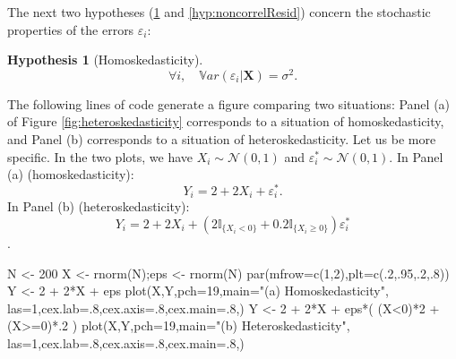 \documentclass[
  12pt,
]{book}
\newenvironment{Shaded}{\begin{snugshade}}{\end{snugshade}}
\newcommand{\AttributeTok}[1]{\textcolor[rgb]{0.77,0.63,0.00}{#1}}
\newcommand{\DecValTok}[1]{\textcolor[rgb]{0.00,0.00,0.81}{#1}}
\newcommand{\FunctionTok}[1]{\textcolor[rgb]{0.00,0.00,0.00}{#1}}
\newcommand{\NormalTok}[1]{#1}
\newcommand{\OtherTok}[1]{\textcolor[rgb]{0.56,0.35,0.01}{#1}}
\newcommand{\SpecialCharTok}[1]{\textcolor[rgb]{0.00,0.00,0.00}{#1}}
\newcommand{\StringTok}[1]{\textcolor[rgb]{0.31,0.60,0.02}{#1}}
\theoremstyle{definition}
\theoremstyle{definition}
\theoremstyle{definition}
\theoremstyle{definition}
\newtheorem{hypothesis}{Hypothesis}[chapter]
\theoremstyle{remark}
\begin{document}
The next two hypotheses (\ref{hyp:homoskedasticity} and \ref{hyp:noncorrelResid}) concern the stochastic properties of the errors \(\varepsilon_i\):

\begin{hypothesis}[Homoskedasticity]
\protect\hypertarget{hyp:homoskedasticity}{}\label{hyp:homoskedasticity}\[
\forall i, \quad \mathbb{V}ar(\varepsilon_i|\mathbf{X}) = \sigma^2.
\]
\end{hypothesis}

The following lines of code generate a figure comparing two situations: Panel (a) of Figure \ref{fig:heteroskedasticity} corresponds to a situation of homoskedasticity, and Panel (b) corresponds to a situation of heteroskedasticity. Let us be more specific. In the two plots, we have \(X_i \sim \mathcal{N}(0,1)\) and \(\varepsilon^*_i \sim \mathcal{N}(0,1)\). In Panel (a) (homoskedasticity):
\[
Y_i = 2 + 2X_i + \varepsilon^*_i.
\]
In Panel (b) (heteroskedasticity):
\[
Y_i = 2 + 2X_i + \left(2\mathbb{I}_{\{X_i<0\}}+0.2\mathbb{I}_{\{X_i\ge0\}}\right)\varepsilon^*_i\].

\begin{Shaded}
\begin{Highlighting}[]
\NormalTok{N }\OtherTok{\textless{}{-}} \DecValTok{200}
\NormalTok{X }\OtherTok{\textless{}{-}} \FunctionTok{rnorm}\NormalTok{(N);eps }\OtherTok{\textless{}{-}} \FunctionTok{rnorm}\NormalTok{(N)}
\FunctionTok{par}\NormalTok{(}\AttributeTok{mfrow=}\FunctionTok{c}\NormalTok{(}\DecValTok{1}\NormalTok{,}\DecValTok{2}\NormalTok{),}\AttributeTok{plt=}\FunctionTok{c}\NormalTok{(.}\DecValTok{2}\NormalTok{,.}\DecValTok{95}\NormalTok{,.}\DecValTok{2}\NormalTok{,.}\DecValTok{8}\NormalTok{))}
\NormalTok{Y }\OtherTok{\textless{}{-}} \DecValTok{2} \SpecialCharTok{+} \DecValTok{2}\SpecialCharTok{*}\NormalTok{X }\SpecialCharTok{+}\NormalTok{ eps}
\FunctionTok{plot}\NormalTok{(X,Y,}\AttributeTok{pch=}\DecValTok{19}\NormalTok{,}\AttributeTok{main=}\StringTok{"(a) Homoskedasticity"}\NormalTok{,}
     \AttributeTok{las=}\DecValTok{1}\NormalTok{,}\AttributeTok{cex.lab=}\NormalTok{.}\DecValTok{8}\NormalTok{,}\AttributeTok{cex.axis=}\NormalTok{.}\DecValTok{8}\NormalTok{,}\AttributeTok{cex.main=}\NormalTok{.}\DecValTok{8}\NormalTok{,)}
\NormalTok{Y }\OtherTok{\textless{}{-}} \DecValTok{2} \SpecialCharTok{+} \DecValTok{2}\SpecialCharTok{*}\NormalTok{X }\SpecialCharTok{+}\NormalTok{ eps}\SpecialCharTok{*}\NormalTok{( (X}\SpecialCharTok{\textless{}}\DecValTok{0}\NormalTok{)}\SpecialCharTok{*}\DecValTok{2} \SpecialCharTok{+}\NormalTok{ (X}\SpecialCharTok{\textgreater{}=}\DecValTok{0}\NormalTok{)}\SpecialCharTok{*}\NormalTok{.}\DecValTok{2}\NormalTok{ )}
\FunctionTok{plot}\NormalTok{(X,Y,}\AttributeTok{pch=}\DecValTok{19}\NormalTok{,}\AttributeTok{main=}\StringTok{"(b) Heteroskedasticity"}\NormalTok{,}
     \AttributeTok{las=}\DecValTok{1}\NormalTok{,}\AttributeTok{cex.lab=}\NormalTok{.}\DecValTok{8}\NormalTok{,}\AttributeTok{cex.axis=}\NormalTok{.}\DecValTok{8}\NormalTok{,}\AttributeTok{cex.main=}\NormalTok{.}\DecValTok{8}\NormalTok{,)}
\end{Highlighting}
\end{Shaded}
\end{document}
